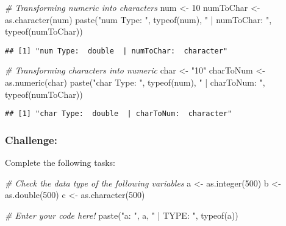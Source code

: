 \documentclass[
]{article}
\newenvironment{Shaded}{\begin{snugshade}}{\end{snugshade}}
\newcommand{\CommentTok}[1]{\textcolor[rgb]{0.56,0.35,0.01}{\textit{#1}}}
\newcommand{\DecValTok}[1]{\textcolor[rgb]{0.00,0.00,0.81}{#1}}
\newcommand{\FunctionTok}[1]{\textcolor[rgb]{0.00,0.00,0.00}{#1}}
\newcommand{\NormalTok}[1]{#1}
\newcommand{\OtherTok}[1]{\textcolor[rgb]{0.56,0.35,0.01}{#1}}
\newcommand{\StringTok}[1]{\textcolor[rgb]{0.31,0.60,0.02}{#1}}
\begin{document}
\begin{Shaded}
\begin{Highlighting}[]
\CommentTok{\# Transforming numeric into characters}
\NormalTok{num }\OtherTok{\textless{}{-}} \DecValTok{10}
\NormalTok{numToChar }\OtherTok{\textless{}{-}} \FunctionTok{as.character}\NormalTok{(num)}
\FunctionTok{paste}\NormalTok{(}\StringTok{"num Type: "}\NormalTok{, }\FunctionTok{typeof}\NormalTok{(num), }\StringTok{" | numToChar: "}\NormalTok{, }\FunctionTok{typeof}\NormalTok{(numToChar))}
\end{Highlighting}
\end{Shaded}

\begin{verbatim}
## [1] "num Type:  double  | numToChar:  character"
\end{verbatim}

\begin{Shaded}
\begin{Highlighting}[]
\CommentTok{\# Transforming characters into numeric}
\NormalTok{char }\OtherTok{\textless{}{-}} \StringTok{"10"}
\NormalTok{charToNum }\OtherTok{\textless{}{-}} \FunctionTok{as.numeric}\NormalTok{(char)}
\FunctionTok{paste}\NormalTok{(}\StringTok{"char Type: "}\NormalTok{, }\FunctionTok{typeof}\NormalTok{(num), }\StringTok{" | charToNum: "}\NormalTok{, }\FunctionTok{typeof}\NormalTok{(numToChar))}
\end{Highlighting}
\end{Shaded}

\begin{verbatim}
## [1] "char Type:  double  | charToNum:  character"
\end{verbatim}

\hypertarget{challenge}{%
\subsubsection{Challenge:}\label{challenge}}

Complete the following tasks:

\begin{Shaded}
\begin{Highlighting}[]
\CommentTok{\# Check the data type of the following variables}
\NormalTok{a }\OtherTok{\textless{}{-}} \FunctionTok{as.integer}\NormalTok{(}\DecValTok{500}\NormalTok{)}
\NormalTok{b }\OtherTok{\textless{}{-}} \FunctionTok{as.double}\NormalTok{(}\DecValTok{500}\NormalTok{)}
\NormalTok{c }\OtherTok{\textless{}{-}} \FunctionTok{as.character}\NormalTok{(}\DecValTok{500}\NormalTok{)}

\CommentTok{\# Enter your code here!}
\FunctionTok{paste}\NormalTok{(}\StringTok{"a: "}\NormalTok{, a, }\StringTok{" | TYPE: "}\NormalTok{, }\FunctionTok{typeof}\NormalTok{(a))}
\end{Highlighting}
\end{Shaded}
\end{document}
